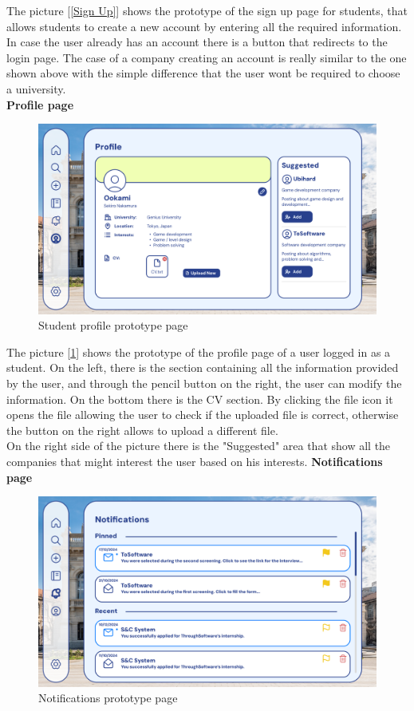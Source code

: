 \documentclass[11pt,twoside]{article}
\begin{document}
The picture [\ref{Sign Up}] shows the prototype of the sign up page for students, that allows students to create a new account by entering all the required information. In case the user already has an account there is a button that redirects to the login page. The case of a company creating an account is really similar to the one shown above with the simple difference that the user wont be required to choose a university.
\vspace{1\baselineskip} \\
\large{\textbf{Profile page}}
\begin{figure}[H]
\includegraphics[width=\textwidth]{Images/Profile}
\caption{Student profile prototype page}\label{Student Profile}
\end{figure}
The picture [\ref{Student Profile}] shows the prototype of the profile page of a user logged in as a student. On the left, there is the section containing all the information provided by the user, and through the pencil button on the right, the user can modify the information. On the bottom there is the CV section. By clicking the file icon it opens the file allowing the user to check if the uploaded file is correct, otherwise the button on the right allows to upload a different file.\\
On the right side of the picture there is the "Suggested" area that show all the companies that might interest the user based on his interests.
\newpage
\large{\textbf{Notifications page}}
\begin{figure}[H]
\includegraphics[width=\textwidth]{Images/Notifications}
\caption{Notifications prototype page}\label{Notifications}
\end{figure}
\end{document}
